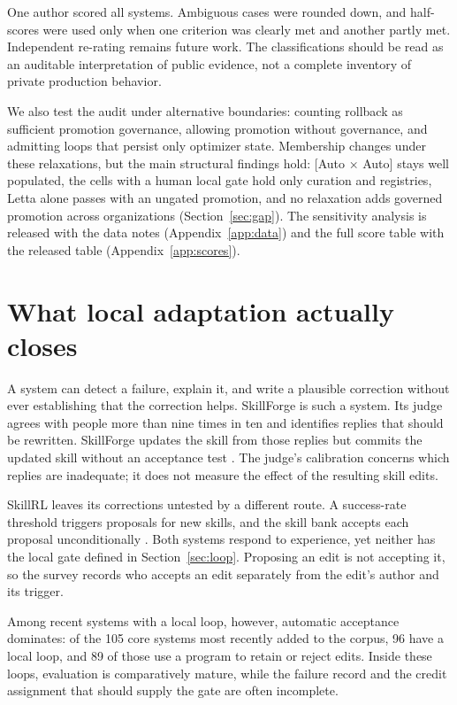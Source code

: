 \documentclass[
  11pt,
]{article}
\begin{document}
One author scored all systems. Ambiguous cases were rounded down, and half-scores were used only when one criterion was clearly met and another partly met. Independent re-rating remains future work. The classifications should be read as an auditable interpretation of public evidence, not a complete inventory of private production behavior.

We also test the audit under alternative boundaries: counting rollback as sufficient promotion governance, allowing promotion without governance, and admitting loops that persist only optimizer state. Membership changes under these relaxations, but the main structural findings hold: {[}Auto × Auto{]} stays well populated, the cells with a human local gate hold only curation and registries, Letta alone passes with an ungated promotion, and no relaxation adds governed promotion across organizations (Section~\ref{sec:gap}). The sensitivity analysis is released with the data notes (Appendix~\ref{app:data}) and the full score table with the released table (Appendix~\ref{app:scores}).

\section{What local adaptation actually closes}\label{sec:findings}

A system can detect a failure, explain it, and write a plausible correction without ever establishing that the correction helps. SkillForge is such a system. Its judge agrees with people more than nine times in ten and identifies replies that should be rewritten. SkillForge updates the skill from those replies but commits the updated skill without an acceptance test \cite{skillforge2026}. The judge's calibration concerns which replies are inadequate; it does not measure the effect of the resulting skill edits.

SkillRL leaves its corrections untested by a different route. A success-rate threshold triggers proposals for new skills, and the skill bank accepts each proposal unconditionally \cite{skillrl2026}. Both systems respond to experience, yet neither has the local gate defined in Section~\ref{sec:loop}. Proposing an edit is not accepting it, so the survey records who accepts an edit separately from the edit's author and its trigger.

Among recent systems with a local loop, however, automatic acceptance dominates: of the 105 core systems most recently added to the corpus, 96 have a local loop, and 89 of those use a program to retain or reject edits. Inside these loops, evaluation is comparatively mature, while the failure record and the credit assignment that should supply the gate are often incomplete.
\end{document}

